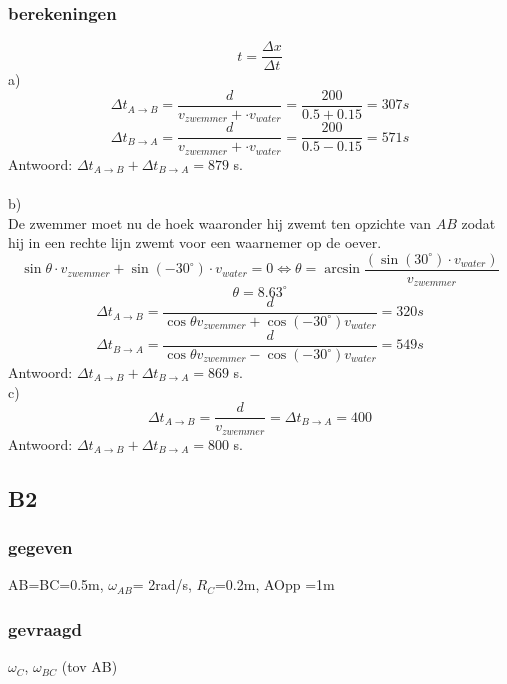 \documentclass[10pt,a4paper]{article}
\begin{document}
\subsubsection*{berekeningen}
\[
t = \frac{\Delta x}{\Delta t}
\]
a)\\
\[
\Delta t_{A\rightarrow B} = \frac{d}{v_{zwemmer} + \cdot v_{water}} = \frac{200}{0.5+0.15} = 307 s
\]
\[
\Delta t_{B\rightarrow A} = \frac{d}{v_{zwemmer} + \cdot v_{water}} = \frac{200}{0.5-0.15} = 571 s
\]
Antwoord:
$\Delta t_{A\rightarrow B} + \Delta t_{B\rightarrow A} = 879$ s.\\\\
b)\\
De zwemmer moet nu de hoek waaronder hij zwemt ten opzichte van $AB$ zodat hij in een rechte lijn zwemt voor een waarnemer op de oever.
\[
\sin{\theta}\cdot v_{zwemmer} + \sin{(-30^\circ)}\cdot v_{water} = 0 \Leftrightarrow \theta=\arcsin{\frac{(\sin{(30^\circ)}\cdot v_{water})}{v_{zwemmer}}}
\]
\[
\theta = 8.63^\circ
\]
\[
\Delta t_{A\rightarrow B} = \frac{d}{\cos{\theta}v_{zwemmer} + \cos{(-30^\circ)}v_{water}}=320 s
\]
\[
\Delta t_{B\rightarrow A} = \frac{d}{\cos{\theta}v_{zwemmer} - \cos{(-30^\circ)}v_{water}}=549 s
\]
Antwoord:
$\Delta t_{A\rightarrow B} + \Delta t_{B\rightarrow A} = 869$ s.\\
c)\\
\[
\Delta t_{A\rightarrow B} = \frac{d}{v_{zwemmer}} = \Delta t_{B\rightarrow A} = 400
\]
Antwoord:
$\Delta t_{A\rightarrow B} + \Delta t_{B\rightarrow A} = 800$ s.\\

\subsection{B2}
\subsubsection*{gegeven}
AB=BC=0.5m, $\omega_{AB}$= 2rad/s, $R_C$=0.2m, AOpp =1m
\subsubsection*{gevraagd}
$\omega_C$, $\omega_{BC}$ (tov AB)
\end{document}
